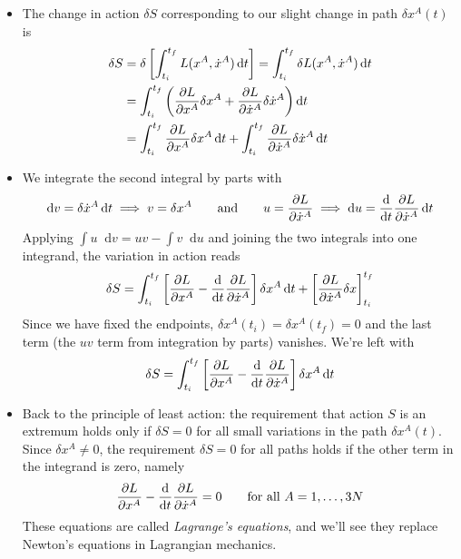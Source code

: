 \documentclass[11pt, a4paper]{article}
\newcommand{\eqtext}[1]{\qquad \text{#1} \qquad}
\newcommand{\diff}{\mathop{}\!\mathrm{d}} %
\begin{document}
\begin{itemize}
	\item The change in action $ \delta S $ corresponding to our slight change in path $ \delta x^{A}(t) $ is
	\begin{align*}
		\delta S &= \delta \left[\int_{t_{i}}^{t_{f}}L(x^{A}, \dot{x}^{A}) \diff t \right] = \int_{t_{i}}^{t_{f}} \delta L(x^{A}, \dot{x}^{A}) \diff t\\
		& = \int_{t_{i}}^{t_{f}} \left(\pdv{L}{x^{A}} \delta x^{A} + \pdv{L}{\dot{x}^{A}} \delta \dot{x}^{A} \right) \diff t\\
		&= \int_{t_{i}}^{t_{f}}\pdv{L}{x^{A}} \delta x^{A} \diff t + \int_{t_{i}}^{t_{f}}\pdv{L}{\dot{x}^{A}} \delta \dot{x}^{A} \diff t
	\end{align*}
	
	\item We integrate the second integral by parts with 
	\begin{equation*}
		\diff v = \delta \dot{x}^{A} \diff t \implies v = \delta x^{A} \eqtext{and} u = \pdv{L}{\dot{x}^{A}}  \implies \diff u = \dv{}{t}\pdv{L}{\dot{x}^{A}} \diff t
	\end{equation*}
	Applying $ \int u \diff v = uv - \int v \diff u $ and joining the two integrals into one integrand, the variation in action reads 
	\begin{equation*}
		\delta S = \int_{t_{i}}^{t_{f}}\left[\pdv{L}{x^{A}} - \dv{}{t}\pdv{L}{\dot{x}^{A}} \right] \delta x^{A} \diff t + \left[\pdv{L}{\dot{x}^{A}} \delta x\right]_{t_{i}}^{t_{f}}
	\end{equation*}
	Since we have fixed the endpoints, $ \delta x^{A}(t_{i}) = \delta x^{A}(t_{f}) = 0 $ and the last term (the $ uv $ term from integration by parts) vanishes. We're left with
	\begin{equation*}
		\delta S = \int_{t_{i}}^{t_{f}}\left[\pdv{L}{x^{A}} - \dv{}{t}\pdv{L}{\dot{x}^{A}} \right] \delta x^{A} \diff t
	\end{equation*}
	
	\item Back to the principle of least action: the requirement that action $ S $ is an extremum holds only if $ \delta S = 0 $ for all small variations in the path $ \delta x^{A}(t) $. Since $ \delta x^{A} \neq 0 $, the requirement $ \delta S = 0 $ for all paths holds if the other term in the integrand is zero, namely
	\begin{equation*}
		\pdv{L}{x^{A}} - \dv{}{t}\pdv{L}{\dot{x}^{A}} = 0 \qquad \text{for all } A = 1, \ldots, 3N
	\end{equation*}
	These equations are called \textit{Lagrange's equations}, and we'll see they replace Newton's equations in Lagrangian mechanics. 
	

\end{itemize}
\end{document}
